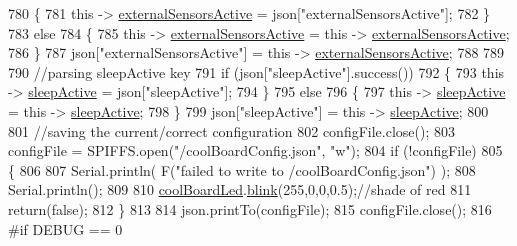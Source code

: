 \begin{DoxyCode}
780             \{
781                 \textcolor{keyword}{this} -> \hyperlink{class_cool_board_a638b00b76aeb819ecfd4c10b8cdd7bb7}{externalSensorsActive} = json[\textcolor{stringliteral}{"externalSensorsActive"}];
782             \}
783             \textcolor{keywordflow}{else}
784             \{
785                 \textcolor{keyword}{this} -> \hyperlink{class_cool_board_a638b00b76aeb819ecfd4c10b8cdd7bb7}{externalSensorsActive} = \textcolor{keyword}{this} -> 
      \hyperlink{class_cool_board_a638b00b76aeb819ecfd4c10b8cdd7bb7}{externalSensorsActive};
786             \}
787             json[\textcolor{stringliteral}{"externalSensorsActive"}] = \textcolor{keyword}{this} -> \hyperlink{class_cool_board_a638b00b76aeb819ecfd4c10b8cdd7bb7}{externalSensorsActive};
788 
789             
790             \textcolor{comment}{//parsing sleepActive key}
791             \textcolor{keywordflow}{if} (json[\textcolor{stringliteral}{"sleepActive"}].success())
792             \{
793                 \textcolor{keyword}{this} -> \hyperlink{class_cool_board_a0a51b2287139f66c738101fb53139230}{sleepActive} = json[\textcolor{stringliteral}{"sleepActive"}];
794             \}
795             \textcolor{keywordflow}{else}
796             \{
797                 \textcolor{keyword}{this} -> \hyperlink{class_cool_board_a0a51b2287139f66c738101fb53139230}{sleepActive} = \textcolor{keyword}{this} -> \hyperlink{class_cool_board_a0a51b2287139f66c738101fb53139230}{sleepActive};
798             \}
799             json[\textcolor{stringliteral}{"sleepActive"}] = \textcolor{keyword}{this} -> \hyperlink{class_cool_board_a0a51b2287139f66c738101fb53139230}{sleepActive};
800 
801             \textcolor{comment}{//saving the current/correct configuration}
802             configFile.close();
803             configFile = SPIFFS.open(\textcolor{stringliteral}{"/coolBoardConfig.json"}, \textcolor{stringliteral}{"w"});
804             \textcolor{keywordflow}{if} (!configFile)
805             \{
806             
807                 Serial.println( F(\textcolor{stringliteral}{"failed to write to /coolBoardConfig.json"}) );
808                 Serial.println();
809 
810                 \hyperlink{class_cool_board_a1b1d3c684a5baa56b08486e192fd8e97}{coolBoardLed}.\hyperlink{class_cool_board_led_a96e1ea13003eee34c9dbcef340404426}{blink}(255,0,0,0.5);\textcolor{comment}{//shade of red     }
811                 \textcolor{keywordflow}{return}(\textcolor{keyword}{false});
812             \}
813 
814             json.printTo(configFile);
815             configFile.close();
816 \textcolor{preprocessor}{            #if DEBUG == 0}

\end{DoxyCode}
